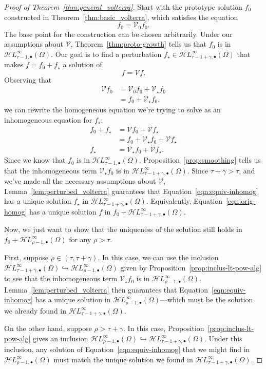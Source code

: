 \documentclass{article}
\theoremstyle{plain}
\newcommand{\singexp}[2]{\mathcal{H}L^\infty_{#1, #2}}
\newcommand{\singexpalg}[1]{\singexp{#1}{\bullet}}
\newcommand{\volterra}{\mathcal{V}}
\newcommand{\hardpart}{\mathcal{V}_0}
\newcommand{\softpart}{\mathcal{V}_\star}
\newcommand{\solwhole}{f}
\newcommand{\solproto}{f_0}
\newcommand{\solptb}{f_\star}
\newcommand{\domain}{\Omega}
\begin{document}
\begin{proof}[Proof of Theorem~\ref{thm:general_volterra}]
Start with the prototype solution $\solproto$ constructed in Theorem~\ref{thm:basic_volterra}, which satisfies the equation
\[ \solproto = \hardpart \solproto. \]
The base point for the construction can be chosen arbitrarily. Under our assumptions about $\volterra$, Theorem~\ref{thm:proto-growth} tells us that $\solproto$ is in $\singexpalg{\tau-1}(\domain)$. Our goal is to find a perturbation $\solptb \in \singexpalg{\tau-1+\gamma}(\domain)$ that makes $\solwhole = \solproto + \solptb$ a solution of
\begin{equation}\label{eqn:orig-homog}
\solwhole = \volterra \solwhole.
\end{equation}
Observing that
\begin{align*}
\volterra \solproto & = \hardpart\solproto + \softpart\solproto \\
& = \solproto + \softpart \solproto,
\end{align*}
we can rewrite the homogeneous equation we're trying to solve as an inhomogeneous equation for $\solptb$:
\begin{align}
\solproto + \solptb & = \volterra\solproto + \volterra\solptb \nonumber \\
& = \solproto + \softpart\solproto + \volterra\solptb \nonumber \\
\solptb & = \softpart\solproto + \volterra\solptb. \label{eqn:equiv-inhomog}
\end{align}
Since we know that $\solproto$ is in $\singexpalg{\tau-1}(\domain)$, Proposition~\ref{prop:smoothing} tells us that the inhomogeneous term $\softpart\solproto$ is in $\singexpalg{\tau-1+\gamma}(\domain)$. Since $\tau+\gamma > \tau$, and we've made all the necessary assumptions about $\volterra$, Lemma~\ref{lem:perturbed_volterra} guarantees that Equation~\eqref{eqn:equiv-inhomog} has a unique solution $\solptb$ in $\singexpalg{\tau-1+\gamma}(\Omega)$. Equivalently, Equation~\eqref{eqn:orig-homog} has a unique solution $f$ in $f_0 + \singexpalg{\tau-1+\gamma}(\domain)$.

Now, we just want to show that the uniqueness of the solution still holds in $f_0 + \singexpalg{\rho-1}(\Omega)$ for any $\rho > \tau$.

First, suppose $\rho \in (\tau, \tau+\gamma)$. In this case, we can use the inclusion $\singexpalg{\tau-1+\gamma}(\Omega) \hookrightarrow \singexpalg{\rho-1}(\Omega)$ given by Proposition~\ref{prop:inclus-lt-pow-alg} to see that the inhomogeneous term $\softpart\solproto$ is in $\singexpalg{\rho-1}(\Omega)$. Lemma~\ref{lem:perturbed_volterra} then guarantees that Equation~\eqref{eqn:equiv-inhomog} has a unique solution in $\singexpalg{\rho-1}(\Omega)$---which must be the solution we already found in $\singexpalg{\tau-1+\gamma}(\Omega)$.

On the other hand, suppose $\rho > \tau+\gamma$. In this case, Proposition~\ref{prop:inclus-lt-pow-alg} gives an inclusion $\singexpalg{\rho-1}(\Omega) \hookrightarrow \singexpalg{\tau-1+\gamma}(\Omega)$. Under this inclusion, any solution of Equation~\eqref{eqn:equiv-inhomog} that we might find in $\singexpalg{\rho-1}(\Omega)$ must match the unique solution we found in $\singexpalg{\tau-1+\gamma}(\Omega)$.
\end{proof}
\end{document}
